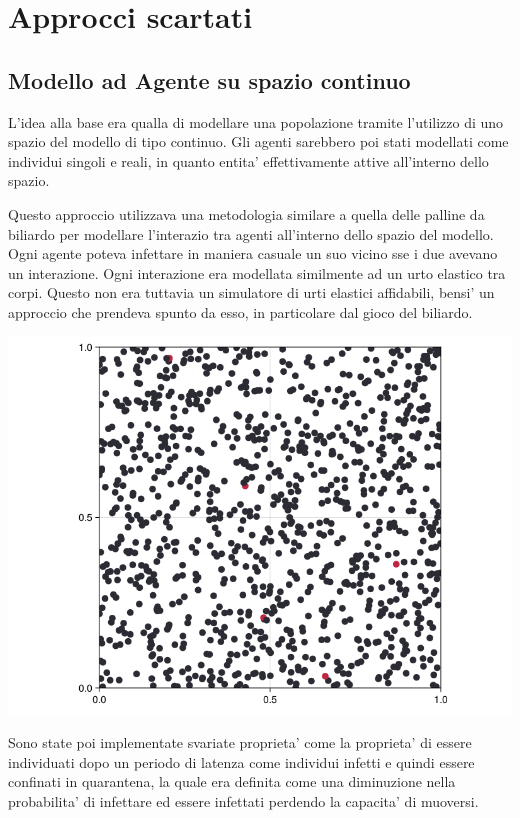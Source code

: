 \section{Approcci scartati}

\subsection{Modello ad Agente su spazio continuo}
L'idea alla base era qualla di modellare una popolazione tramite l'utilizzo di 
uno spazio del modello di tipo continuo. Gli agenti sarebbero poi stati modellati come 
individui singoli e reali, in quanto entita' effettivamente attive all'interno 
dello spazio.

Questo approccio utilizzava una metodologia similare a quella delle palline da biliardo 
per modellare l'interazio tra agenti all'interno dello spazio del modello. Ogni agente poteva
infettare in maniera casuale un suo vicino sse i due avevano un interazione. Ogni interazione
era modellata similmente ad un urto elastico \cite{wiki:Urto_elastico} tra corpi. 
Questo non era tuttavia un simulatore di urti elastici affidabili, bensi' un approccio che prendeva
spunto da esso, in particolare dal gioco del biliardo. 

\begin{minipage}{\linewidth}
    \centering
    \includegraphics[width=\textwidth]{img/ball-covid.png}
    \label{fig:ball_covid}
\end{minipage}

Sono state poi implementate svariate proprieta' come la proprieta' di essere individuati 
dopo un periodo di latenza come individui infetti e quindi essere confinati in quarantena, 
la quale era definita come una diminuzione nella probabilita' di infettare ed essere infettati 
perdendo la capacita' di muoversi.

